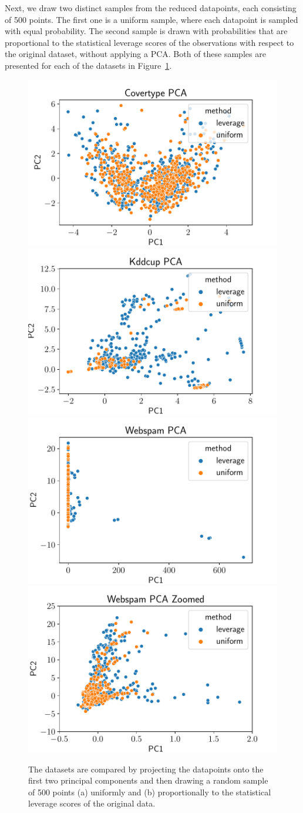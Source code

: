 Next, we draw two distinct samples from the reduced datapoints,
each consisting of 500 points. The first one is a uniform sample,
where each datapoint is sampled with equal probability.
The second sample is drawn with probabilities that are proportional
to the statistical leverage scores of the observations with
respect to the original dataset, without applying a PCA.
Both of these samples are presented for each of the datasets in
Figure~\ref{fig:dataset-comparison}.

\begin{figure}[t!]
    \centering
    \includegraphics[width=.49\linewidth]{figures/covertype_pca.pdf}
    \includegraphics[width=.49\linewidth]{figures/kddcup_pca.pdf}
    \includegraphics[width=.49\linewidth]{figures/webspam_pca.pdf}
    \includegraphics[width=.49\linewidth]{figures/webspam_pca_zoomed.pdf}
    \caption{The datasets are compared by projecting the datapoints
        onto the first two principal components and then drawing
        a random sample of 500 points (a) uniformly and (b) proportionally to the
        statistical leverage scores of the original data.}
    \label{fig:dataset-comparison}
\end{figure}

